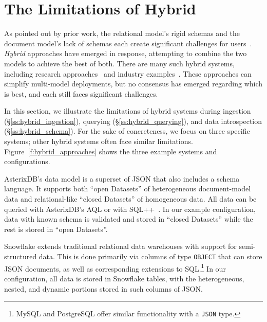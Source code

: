 
\section{The Limitations of Hybrid} \label{s:hybrid}

As pointed out by prior work, the relational model's rigid schemas and the document model's lack of schemas each create significant challenges for users~\cite{snowflake, lorel, asterixdb, what_goes_around}. {\em Hybrid} approaches have emerged in response, attempting to combine the two models to achieve the best of both. There are many such hybrid systems, including research approaches~\cite{asterixdb, sql++, bigdawg, dbms+} and industry examples~\cite{postgres, snowflake, lakehouse, delta_lake, partiql}. These approaches can simplify multi-model deployments, but no consensus has emerged regarding which is best, and each still faces significant challenges.

In this section, we illustrate the limitations of hybrid systems during ingestion (\S\ref{ss:hybrid_ingestion}), querying (\S\ref{ss:hybrid_querying}), and data introspection (\S\ref{ss:hybrid_schema}). For the sake of concreteness, we focus on three specific systems; other hybrid systems often face similar limitations.
Figure~\ref{f:hybrid_approaches} shows the three example systems and configurations.

 AsterixDB's data model is a superset of JSON that also includes a schema language. It supports both ``open Datasets'' of heterogeneous document-model data and relational-like ``closed Datasets'' of homogeneous data. All data can be queried with AsterixDB's AQL or with SQL++~\cite{sql++}. In our example configuration, data with known schema is validated and stored in ``closed Datasets'' while the rest is stored in ``open Datasets''.

 Snowflake extends traditional relational data warehouses with support for semi-structured data. This is done primarily via columns of type \texttt{OBJECT} that can store JSON documents, as well as corresponding extensions to SQL.\footnote{MySQL and PostgreSQL offer similar functionality with a \texttt{JSON} type.} In our configuration, all data is stored in Snowflake tables, with the heterogeneous, nested, and dynamic portions stored in such columns of JSON.

